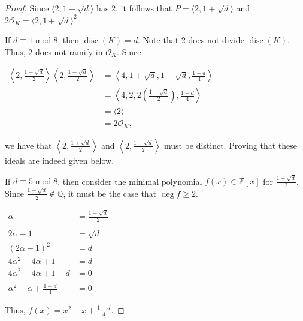 \documentclass[12pt]{article}
\begin{document}
\begin{proof}
Since $\langle 2, 1+\sqrt{d} \rangle$ has  $2$, it follows that $P=\langle 2, 1+\sqrt{d} \rangle$ and $2\mathcal{O}_K=\langle 2, 1+\sqrt{d} \rangle^2$.

If $d \equiv 1 \operatorname{mod} 8$, then $\operatorname{disc}(K)=d$.  Note that $2$ does not divide $\operatorname{disc}(K)$.  Thus, $2$ does not ramify in $\mathcal{O}_K$.  Since

\begin{center}
$\begin{array}{ll}
\displaystyle \left\langle 2, \frac{1+\sqrt{d}}{2} \right\rangle \left\langle 2, \frac{1-\sqrt{d}}{2} \right\rangle & \displaystyle = \left\langle 4, 1+\sqrt{d}, 1-\sqrt{d}, \frac{1-d}{4} \right\rangle \\
& \displaystyle = \left\langle 4, 2, 2\left( \frac{1-\sqrt{d}}{2} \right), \frac{1-d}{4} \right\rangle \\
& = \langle 2 \rangle \\
& = 2\mathcal{O}_K, \end{array}$
\end{center}

we have that $\displaystyle \left\langle 2, \frac{1+\sqrt{d}}{2} \right\rangle$ and $\displaystyle \left\langle 2, \frac{1-\sqrt{d}}{2} \right\rangle$ must be distinct.  Proving that these ideals are indeed  given below.

If $d \equiv 5 \operatorname{mod} 8$, then consider the minimal polynomial $f(x) \in \mathbb{Z}[x]$ for $\displaystyle \frac{1+\sqrt{d}}{2}$.  Since $\displaystyle \frac{1+\sqrt{d}}{2} \notin \mathbb{Q}$, it must be the case that $\operatorname{deg}f \ge 2$.

\begin{center}
$\begin{array}{rl}
\alpha & \displaystyle = \frac{1+\sqrt{d}}{2} \\
& \\
2\alpha - 1 & = \sqrt{d} \\
(2\alpha - 1)^2 & = d \\
4\alpha^2 - 4\alpha + 1 & = d \\
4\alpha^2 - 4\alpha + 1 - d & = 0 \\
& \\
\displaystyle \alpha^2 - \alpha + \frac{1-d}{4} & = 0 \end{array}$
\end{center}

Thus, $\displaystyle f(x)=x^2-x+\frac{1-d}{4}$.


\end{proof}
\end{document}
